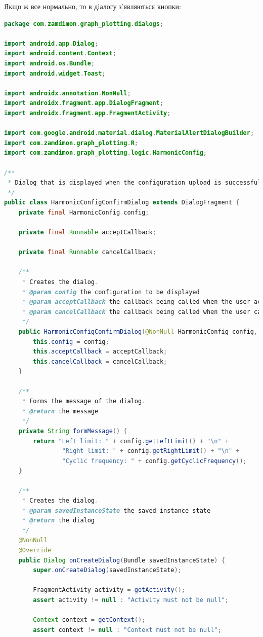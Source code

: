 \documentclass[oneside,solution]{android-assign}
\begin{document}
Якщо ж все нормально, то в діалогу з'являються кнопки:
\begin{lstlisting}[language=java]
package com.zamdimon.graph_plotting.dialogs;

import android.app.Dialog;
import android.content.Context;
import android.os.Bundle;
import android.widget.Toast;

import androidx.annotation.NonNull;
import androidx.fragment.app.DialogFragment;
import androidx.fragment.app.FragmentActivity;

import com.google.android.material.dialog.MaterialAlertDialogBuilder;
import com.zamdimon.graph_plotting.R;
import com.zamdimon.graph_plotting.logic.HarmonicConfig;

/**
 * Dialog that is displayed when the configuration upload is successful.
 */
public class HarmonicConfigConfirmDialog extends DialogFragment {
    private final HarmonicConfig config;

    private final Runnable acceptCallback;

    private final Runnable cancelCallback;

    /**
     * Creates the dialog.
     * @param config the configuration to be displayed
     * @param acceptCallback the callback being called when the user accepts the upload
     * @param cancelCallback the callback being called when the user cancels the upload
     */
    public HarmonicConfigConfirmDialog(@NonNull HarmonicConfig config, Runnable acceptCallback, Runnable cancelCallback) {
        this.config = config;
        this.acceptCallback = acceptCallback;
        this.cancelCallback = cancelCallback;
    }

    /**
     * Forms the message of the dialog.
     * @return the message
     */
    private String formMessage() {
        return "Left limit: " + config.getLeftLimit() + "\n" +
                "Right limit: " + config.getRightLimit() + "\n" +
                "Cyclic frequency: " + config.getCyclicFrequency();
    }

    /**
     * Creates the dialog.
     * @param savedInstanceState the saved instance state
     * @return the dialog
     */
    @NonNull
    @Override
    public Dialog onCreateDialog(Bundle savedInstanceState) {
        super.onCreateDialog(savedInstanceState);

        FragmentActivity activity = getActivity();
        assert activity != null : "Activity must not be null";

        Context context = getContext();
        assert context != null : "Context must not be null";


\end{lstlisting}
\end{document}
